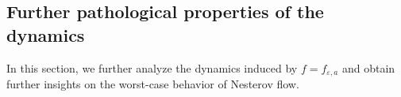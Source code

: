 \documentclass{article}
\newtheorem{proposition}[theorem]{Proposition}
\theoremstyle{remark}
\newcommand{\dd}{\,\mathrm{d}}
\begin{document}



\subsection{Further pathological properties of the dynamics}




In this section, we further analyze the dynamics induced by $f=f_{\varepsilon,a}$ and obtain further insights on the worst-case behavior of Nesterov flow.
\end{document}
